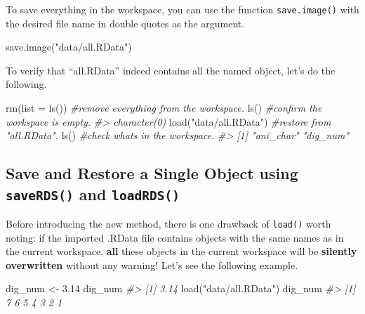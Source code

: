\documentclass[
]{book}
\newenvironment{Shaded}{\begin{snugshade}}{\end{snugshade}}
\newcommand{\AttributeTok}[1]{\textcolor[rgb]{0.77,0.63,0.00}{#1}}
\newcommand{\CommentTok}[1]{\textcolor[rgb]{0.56,0.35,0.01}{\textit{#1}}}
\newcommand{\FloatTok}[1]{\textcolor[rgb]{0.00,0.00,0.81}{#1}}
\newcommand{\FunctionTok}[1]{\textcolor[rgb]{0.00,0.00,0.00}{#1}}
\newcommand{\NormalTok}[1]{#1}
\newcommand{\OtherTok}[1]{\textcolor[rgb]{0.56,0.35,0.01}{#1}}
\newcommand{\StringTok}[1]{\textcolor[rgb]{0.31,0.60,0.02}{#1}}
\begin{document}
To save everything in the workspace, you can use the function \texttt{save.image()} with the desired file name in double quotes as the argument.

\begin{Shaded}
\begin{Highlighting}[]
\FunctionTok{save.image}\NormalTok{(}\StringTok{"data/all.RData"}\NormalTok{)}
\end{Highlighting}
\end{Shaded}

To verify that ``all.RData'' indeed contains all the named object, let's do the following.

\begin{Shaded}
\begin{Highlighting}[]
\FunctionTok{rm}\NormalTok{(}\AttributeTok{list =} \FunctionTok{ls}\NormalTok{())        }\CommentTok{\#remove everything from the workspace.}
\FunctionTok{ls}\NormalTok{()                   }\CommentTok{\#confirm the workspace is empty.}
\CommentTok{\#\textgreater{} character(0)}
\FunctionTok{load}\NormalTok{(}\StringTok{"data/all.RData"}\NormalTok{) }\CommentTok{\#restore from "all.RData".}
\FunctionTok{ls}\NormalTok{()                   }\CommentTok{\#check what\textquotesingle{}s in the workspace.}
\CommentTok{\#\textgreater{} [1] "ani\_char" "dig\_num"}
\end{Highlighting}
\end{Shaded}

\hypertarget{save-and-restore-a-single-object-using-saverds-and-loadrds}{%
\subsection{\texorpdfstring{Save and Restore a Single Object using \texttt{saveRDS()} and \texttt{loadRDS()}}{Save and Restore a Single Object using saveRDS() and loadRDS()}}\label{save-and-restore-a-single-object-using-saverds-and-loadrds}}

Before introducing the new method, there is one drawback of \texttt{load()} worth noting: if the imported .RData file contains objects with the same names as in the current workspace, \textbf{all} these objects in the current workspace will be \textbf{silently overwritten} without any warning! Let's see the following example.

\begin{Shaded}
\begin{Highlighting}[]
\NormalTok{dig\_num }\OtherTok{\textless{}{-}} \FloatTok{3.14}
\NormalTok{dig\_num}
\CommentTok{\#\textgreater{} [1] 3.14}
\FunctionTok{load}\NormalTok{(}\StringTok{"data/all.RData"}\NormalTok{)}
\NormalTok{dig\_num}
\CommentTok{\#\textgreater{} [1] 7 6 5 4 3 2 1}
\end{Highlighting}
\end{Shaded}
\end{document}
